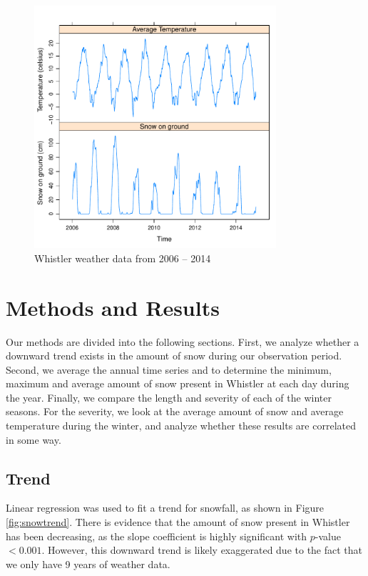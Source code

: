 \documentclass[12pt,twoside]{article}
\begin{document}
{\begin{figure}[!ht]
\begin{center}
\includegraphics[width=0.8\textwidth]{report-basicts}
\end{center}
\vspace{-5mm}
\caption{Whistler weather data from 2006 -- 2014}
\label{fig:basicts}
\end{figure}

\section{Methods and Results}

Our methods are divided into the following sections. First, we analyze whether a downward trend exists in the amount of snow during our observation period. Second, we average the annual time series and to determine the minimum, maximum and average amount of snow present in Whistler at each day during the year. Finally, we compare the length and severity of each of the winter seasons. For the severity, we look at the average amount of snow and average temperature during the winter, and analyze whether these results are correlated in some way.

\subsection{Trend}

Linear regression was used to fit a trend for snowfall, as shown in Figure \ref{fig:snowtrend}. There is evidence that the amount of snow present in Whistler has been decreasing, as the slope coefficient is highly significant with $p$-value $< 0.001$. However, this downward trend is likely exaggerated due to the fact that we only have 9 years of weather data. 

}
\end{document}

